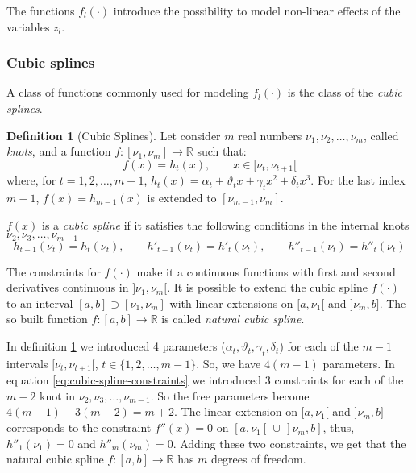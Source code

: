 \documentclass[a4paper, twoside, openright, 12pt]{report}
\theoremstyle{definition}
\newtheorem{definition}{Definition}[chapter]
\theoremstyle{definition}
\theoremstyle{definition}
\theoremstyle{remark}
\begin{document}
The functions \(f_l(\cdot)\) introduce the possibility to model non-linear effects of the variables \(z_l\).

\hypertarget{chap:cubic-splines}{%
\subsubsection{Cubic splines}\label{chap:cubic-splines}}

A class of functions commonly used for modeling \(f_l(\cdot)\) is the class of the \emph{cubic splines}.

\begin{definition}[Cubic Splines]
\label{def:cubic-splines} \iffalse (Cubic Splines) \fi{} Let consider \(m\) real numbers \(\nu_1, \nu_2, \dots, \nu_m\), called \textit{knots}, and a function \(f:[\nu_1, \nu_m] \to \mathbb{R}\) such that:
\[
f(x) = h_t(x), \qquad x\in[\nu_t, \nu_{t+1}[
\]
where, for \(t = 1, 2, \dots, m-1\), \(h_t(x) = \alpha_t + \vartheta_t x + \gamma_t x^2 + \delta_t x^3\). For the last index \(m-1\), \(f(x) = h_{m-1}(x)\) is extended to \([\nu_{m-1}, \nu_{m}]\).

\(f(x)\) is a \textit{cubic spline} if it satisfies the following conditions in the internal knots \(\nu_2, \nu_3, \dots, \nu_{m-1}\)
\begin{equation}
\label{eq:cubic-spline-constraints}
h_{t-1}(\nu_t) = h_{t}(\nu_t), \qquad h'_{t-1}(\nu_t) = h'_{t}(\nu_t), \qquad h''_{t-1}(\nu_t) = h''_{t}(\nu_t)
\end{equation}
\end{definition}

The constraints for \(f(\cdot)\) make it a continuous functions with first and second derivatives continuous in \(]\nu_1, \nu_m[\). It is possible to extend the cubic spline \(f(\cdot)\) to an interval \([a, b] \supset [\nu_1, \nu_m]\) with linear extensions on \([a, \nu_1[\) and \(]\nu_m, b]\). The so built function \(f:[a,b]\to\mathbb{R}\) is called \emph{natural cubic spline}.

In definition \ref{def:cubic-splines} we introduced 4 parameters (\(\alpha_t, \vartheta_t, \gamma_t, \delta_t\)) for each of the \(m-1\) intervals \([\nu_t, \nu_{t+1}[\), \(t\in\{1,2,\dots,m-1\}\). So, we have \(4(m-1)\) parameters. In equation \eqref{eq:cubic-spline-constraints} we introduced \(3\) constraints for each of the \(m-2\) knot in \(\nu_2, \nu_3, \dots, \nu_{m-1}\). So the free parameters become \(4(m-1) - 3(m-2) = m+2\). The linear extension on \([a, \nu_1[\) and \(]\nu_m, b]\) corresponds to the constraint \(f''(x)=0\) on \([a, \nu_1[ \, \cup \, ]\nu_m, b]\), thus, \(h''_1(\nu_1)=0\) and \(h''_m(\nu_m)=0\). Adding these two constraints, we get that the natural cubic spline \(f:[a,b]\to\mathbb{R}\) has \(m\) degrees of freedom.
\end{document}
